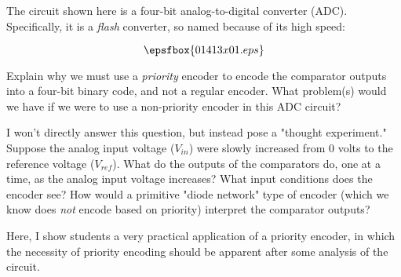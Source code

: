 

The circuit shown here is a four-bit analog-to-digital converter (ADC).  Specifically, it is a {\it flash} converter, so named because of its high speed:

$$\epsfbox{01413x01.eps}$$

Explain why we must use a {\it priority} encoder to encode the comparator outputs into a four-bit binary code, and not a regular encoder.  What problem(s) would we have if we were to use a non-priority encoder in this ADC circuit?







I won't directly answer this question, but instead pose a "thought experiment."  Suppose the analog input voltage ($V_{in}$) were slowly increased from 0 volts to the reference voltage ($V_{ref}$).  What do the outputs of the comparators do, one at a time, as the analog input voltage increases?  What input conditions does the encoder see?  How would a primitive "diode network" type of encoder (which we know does {\it not} encode based on priority) interpret the comparator outputs?







Here, I show students a very practical application of a priority encoder, in which the necessity of priority encoding should be apparent after some analysis of the circuit.




